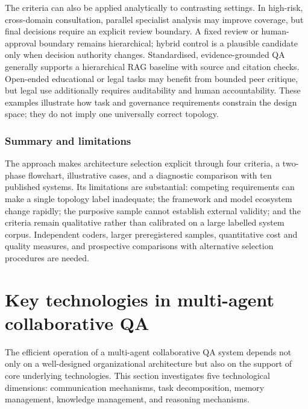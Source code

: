 \documentclass[a4paper,fleqn]{cas-dc}
\begin{document}
The criteria can also be applied analytically to contrasting settings. In
high-risk, cross-domain consultation, parallel specialist analysis may improve
coverage, but final decisions require an explicit review boundary. A fixed
review or human-approval boundary remains hierarchical; hybrid control is a
plausible candidate only when decision authority changes. Standardised,
evidence-grounded QA generally supports a hierarchical RAG baseline with
source and citation checks. Open-ended educational or legal tasks may benefit
from bounded peer critique, but legal use additionally requires auditability
and human accountability. These examples illustrate how task and governance
requirements constrain the design space; they do not imply one universally
correct topology.

\subsubsection{Summary and limitations}
\label{sec:limitations}

The approach makes architecture selection explicit through four criteria, a
two-phase flowchart, illustrative cases, and a diagnostic comparison with ten
published systems. Its limitations are substantial: competing requirements
can make a single topology label inadequate; the framework and model ecosystem
change rapidly; the purposive sample cannot establish external validity; and
the criteria remain qualitative rather than calibrated on a large labelled
system corpus. Independent coders, larger preregistered samples, quantitative
cost and quality measures, and prospective comparisons with alternative
selection procedures are needed.

\section{Key technologies in multi-agent collaborative QA}
\label{sec:key_tech}

The efficient operation of a multi-agent collaborative QA system depends not only on a well-designed organizational architecture but also on the support of core underlying technologies.
This section investigates five technological dimensions: communication
mechanisms, task decomposition, memory management, knowledge management, and
reasoning mechanisms.
\end{document}

